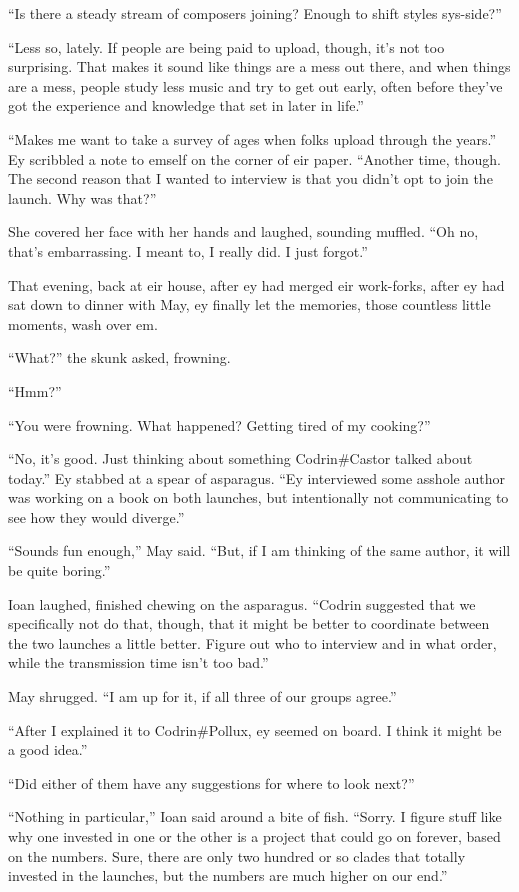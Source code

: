 ``Is there a steady stream of composers joining? Enough to shift styles sys-side?''

``Less so, lately. If people are being paid to upload, though, it's not too surprising. That makes it sound like things are a mess out there, and when things are a mess, people study less music and try to get out early, often before they've got the experience and knowledge that set in later in life.''

``Makes me want to take a survey of ages when folks upload through the years.'' Ey scribbled a note to emself on the corner of eir paper. ``Another time, though. The second reason that I wanted to interview is that you didn't opt to join the launch. Why was that?''

She covered her face with her hands and laughed, sounding muffled. ``Oh no, that's embarrassing. I meant to, I really did. I just forgot.''

That evening, back at eir house, after ey had merged eir work-forks, after ey had sat down to dinner with May, ey finally let the memories, those countless little moments, wash over em.

``What?'' the skunk asked, frowning.

``Hmm?''

``You were frowning. What happened? Getting tired of my cooking?''

``No, it's good. Just thinking about something Codrin\#Castor talked about today.'' Ey stabbed at a spear of asparagus. ``Ey interviewed some asshole author was working on a book on both launches, but intentionally not communicating to see how they would diverge.''

``Sounds fun enough,'' May said. ``But, if I am thinking of the same author, it will be quite boring.''

Ioan laughed, finished chewing on the asparagus. ``Codrin suggested that we specifically not do that, though, that it might be better to coordinate between the two launches a little better. Figure out who to interview and in what order, while the transmission time isn't too bad.''

May shrugged. ``I am up for it, if all three of our groups agree.''

``After I explained it to Codrin\#Pollux, ey seemed on board. I think it might be a good idea.''

``Did either of them have any suggestions for where to look next?''

``Nothing in particular,'' Ioan said around a bite of fish. ``Sorry. I figure stuff like why one invested in one or the other is a project that could go on forever, based on the numbers. Sure, there are only two hundred or so clades that totally invested in the launches, but the numbers are much higher on our end.''

